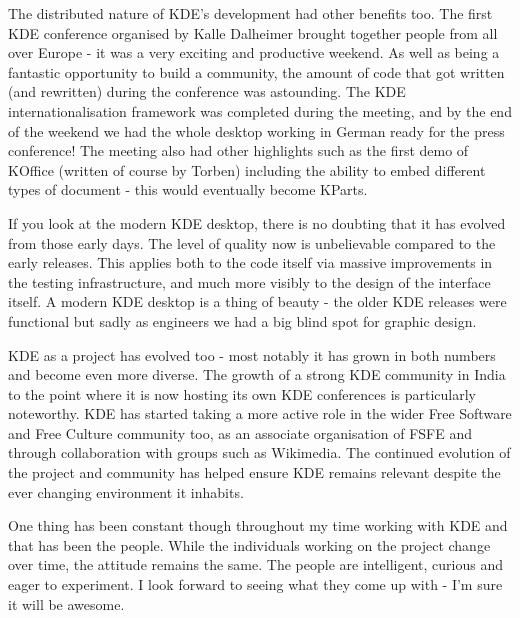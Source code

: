 The distributed nature of KDE's development had other benefits too. The first KDE conference organised by Kalle Dalheimer brought together people from all over Europe - it was a very exciting and productive weekend. As well as being a fantastic opportunity to build a community, the amount of code that got written (and rewritten) during the conference was astounding. The KDE internationalisation framework was completed during the meeting, and by the end of the weekend we had the whole desktop working in German ready for the press conference! The meeting also had other highlights such as the first demo of KOffice (written of course by Torben) including the ability to embed different types of document - this would eventually become KParts.

If you look at the modern KDE desktop, there is no doubting that it has evolved from those early days. The level of quality now is unbelievable compared to the early releases. This applies both to the code itself via massive improvements in the testing infrastructure, and much more visibly to the design of the interface itself. A modern KDE desktop is a thing of beauty - the older KDE releases were functional but sadly as engineers we had a big blind spot for graphic design.

KDE as a project has evolved too - most notably it has grown in both numbers and become even more diverse. The growth of a strong KDE community in India to the point where it is now hosting its own KDE conferences is particularly noteworthy. KDE has started taking a more active role in the wider Free Software and Free Culture community too, as an associate organisation of FSFE and through collaboration with groups such as Wikimedia. The continued evolution of the project and community has helped ensure KDE remains relevant despite the ever changing environment it inhabits.

One thing has been constant though throughout my time working with KDE and that has been the people. While the individuals working on the project change over time, the attitude remains the same. The people are intelligent, curious and eager to experiment. I look forward to seeing what they come up with - I'm sure it will be awesome.
